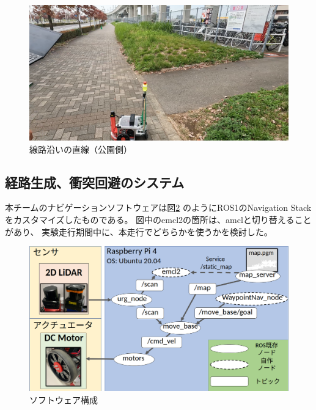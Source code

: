 \documentclass[twocolumn,9pt]{jsproceedings}
\begin{document}
\begin{figure}[h]
  \begin{center}
    \includegraphics[width=1.0\linewidth]{figs/park_side_alley.pdf}
	  \caption{線路沿いの直線（公園側）}
    \label{fig:park_side_alley}
  \end{center}
\end{figure}

\subsection{経路生成、衝突回避のシステム}

本チームのナビゲーションソフトウェアは図\ref{fig:software}
のようにROS1のNavigation Stackをカスタマイズしたものである。
図中のemcl2の箇所は、amclと切り替えることがあり、
実験走行期間中に、本走行でどちらかを使うかを検討した。

\begin{figure}[h]
  \begin{center}
    \includegraphics[width=1.0\linewidth]{figs/software.pdf}
    \caption{ソフトウェア構成}
    \label{fig:software}
  \end{center}
\end{figure}
\end{document}
